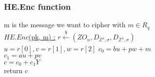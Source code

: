 \subsubsection{HE.Enc function}
m is the message we want to cipher with $m\in R_q$ \\
\underline{$HE.Enc$(pk, m) :} 
\tabNormal $r\xleftarrow[]{\$}(ZO_n, D_{\mathbb{Z}^n, \sigma}, D_{\mathbb{Z}^n, \sigma})$ \\
\tabNormal $u=r[0], v=r[1], w=r[2]$
\tabNormal $c_0 = b u + p w + m $ \\
\tabNormal $c_1 = a u + p v $ \\
\tabNormal $c= c_0 +c_1 Y $ \\
\tabNormal return $c$ 